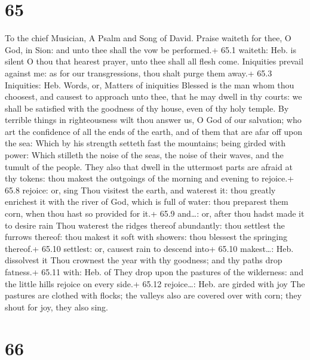 \hypertarget{section-64}{%
\section{65}\label{section-64}}

To the chief Musician, A Psalm and Song of David.  Praise
waiteth for thee, O God, in Sion: and unto thee shall the vow be
performed.+ 65.1 waiteth: Heb. is silent  O thou that
hearest prayer, unto thee shall all flesh come.  Iniquities
prevail against me: as for our transgressions, thou shalt purge them
away.+ 65.3 Iniquities: Heb. Words, or, Matters of iniquities
 Blessed is the man whom thou choosest, and causest to
approach unto thee, that he may dwell in thy courts: we shall be
satisfied with the goodness of thy house, even of thy holy temple.
 By terrible things in righteousness wilt thou answer us, O
God of our salvation; who art the confidence of all the ends of the
earth, and of them that are afar off upon the sea:  Which by
his strength setteth fast the mountains; being girded with power:
 Which stilleth the noise of the seas, the noise of their
waves, and the tumult of the people.  They also that dwell
in the uttermost parts are afraid at thy tokens: thou makest the
outgoings of the morning and evening to rejoice.+ 65.8 rejoice: or, sing
 Thou visitest the earth, and waterest it: thou greatly
enrichest it with the river of God, which is full of water: thou
preparest them corn, when thou hast so provided for it.+ 65.9 and\ldots:
or, after thou hadst made it to desire rain  Thou waterest
the ridges thereof abundantly: thou settlest the furrows thereof: thou
makest it soft with showers: thou blessest the springing thereof.+ 65.10
settlest: or, causest rain to descend into+ 65.10 makest\ldots: Heb.
dissolvest it  Thou crownest the year with thy goodness;
and thy paths drop fatness.+ 65.11 with: Heb. of  They drop
upon the pastures of the wilderness: and the little hills rejoice on
every side.+ 65.12 rejoice\ldots: Heb. are girded with joy 
The pastures are clothed with flocks; the valleys also are covered over
with corn; they shout for joy, they also sing.

\hypertarget{section-65}{%
\section{66}\label{section-65}}

